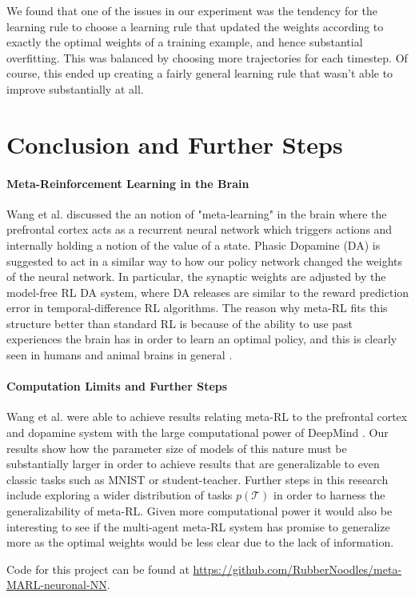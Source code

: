 \documentclass{article}
\begin{document}
We found that one of the issues in our experiment was the tendency for the learning rule to choose a learning rule that updated the weights according to exactly the optimal weights of a training example, and hence substantial overfitting. This was balanced
by choosing more trajectories for each timestep. Of course, this ended up creating a fairly general learning rule that wasn't able to improve substantially at all. 
\section{Conclusion and Further Steps}

\paragraph{Meta-Reinforcement Learning in the Brain} Wang et al. discussed the 
an notion of "meta-learning" in the brain where the prefrontal cortex acts as a recurrent neural network which triggers actions
and internally holding a notion of the value of a state. Phasic Dopamine (DA) is suggested to act in a similar way to
how our policy network changed the weights of the neural network. In particular, the synaptic weights are adjusted
by the model-free RL DA system, where DA releases are similar to the reward prediction error in temporal-difference 
RL algorithms. The reason why meta-RL fits this structure better than standard RL is because of the ability to use past 
experiences the brain has in order to learn an optimal policy, and this is clearly seen in humans and animal brains in general \cite{wang2018pfc}.

\paragraph{Computation Limits and Further Steps} Wang et al. were able to achieve results relating meta-RL to the prefrontal cortex and 
dopamine system with the large computational power of DeepMind \cite{wang2018pfc}. 
Our results show how the parameter size of models of this nature must be substantially 
larger in order to achieve results that are generalizable to even classic tasks such as
MNIST or student-teacher. Further steps in this research include exploring a wider distribution
of tasks $p(\mathcal{T})$ in order to harness the generalizability of meta-RL. Given more computational
power it would also be interesting to see if the multi-agent meta-RL system has promise to generalize
more as the optimal weights would be less clear due to the lack of information.

Code for this project can be found at \url{https://github.com/RubberNoodles/meta-MARL-neuronal-NN}.

 
\end{document}
